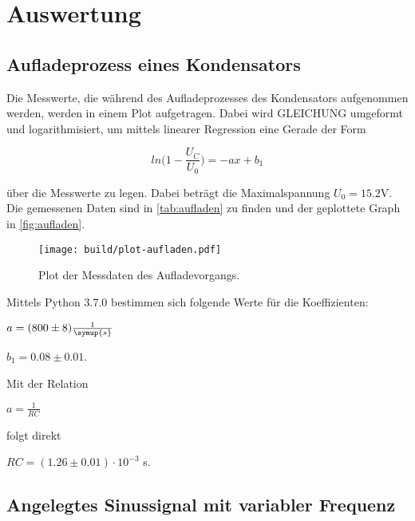 \section{Auswertung}
\label{sec:Auswertung}

\subsection{Aufladeprozess eines Kondensators}
Die Messwerte, die während des Aufladeprozesses des Kondensators aufgenommen werden, werden in einem Plot aufgetragen.
Dabei wird GLEICHUNG umgeformt und logarithmisiert, um mittels linearer Regression eine Gerade der Form

\begin{equation}
    ln\bigg(1  - \frac{U_C}{U_0}\bigg) = -ax + b_1
\end{equation}

über die Messwerte zu legen. Dabei beträgt die Maximalspannung $U_0=15.2$V. Die gemessenen Daten sind in \autoref{tab:aufladen} zu finden und der geplottete Graph in \autoref{fig:aufladen}.



\begin{figure}
    \centering
    \texttt{[image: build/plot-aufladen.pdf]}
    \caption{Plot der Messdaten des Aufladevorgangs.}
    \label{fig:aufladen}
\end{figure}

Mittels Python 3.7.0 bestimmen sich folgende Werte für die Koeffizienten:

\begin{center}
    $a = (800 \pm 8) \frac{1}{\symup{s}}$

    $b_1 = 0.08 \pm 0.01$.
\end{center}

Mit der Relation

\begin{center}
    $a = \frac{1}{RC}$
\end{center}

folgt direkt

\begin{center}
    $RC = (1.26 \pm 0.01) \cdot 10^{-3}$ s.
\end{center}

\subsection{Angelegtes Sinussignal mit variabler Frequenz}


